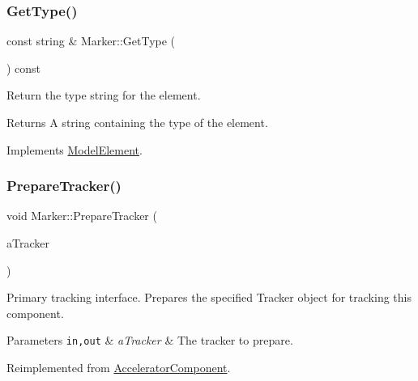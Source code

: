 \mbox{\label{classMarker_a3fc5e5a8665da63bc18a28c604c71036}} 
\subsubsection{\texorpdfstring{Get\+Type()}{GetType()}}
{\footnotesize\ttfamily const string \& Marker\+::\+Get\+Type (\begin{DoxyParamCaption}{ }\end{DoxyParamCaption}) const\hspace{0.3cm}{\ttfamily [virtual]}}

Return the type string for the element. \begin{DoxyReturn}{Returns}
A string containing the type of the element. 
\end{DoxyReturn}


Implements \hyperlink{classModelElement_a04dc2e51e1999fca612eb1838ec6b271}{Model\+Element}.

\mbox{\label{classMarker_a3910ebbb39ce13360e4dd53897c490ce}} 
\subsubsection{\texorpdfstring{Prepare\+Tracker()}{PrepareTracker()}}
{\footnotesize\ttfamily void Marker\+::\+Prepare\+Tracker (\begin{DoxyParamCaption}\item[{\hyperlink{classComponentTracker}{Component\+Tracker} \&}]{a\+Tracker }\end{DoxyParamCaption})\hspace{0.3cm}{\ttfamily [virtual]}}

Primary tracking interface. Prepares the specified Tracker object for tracking this component. 
\begin{DoxyParams}[1]{Parameters}
\mbox{\tt in,out}  & {\em a\+Tracker} & The tracker to prepare. \\
\hline
\end{DoxyParams}


Reimplemented from \hyperlink{classAcceleratorComponent_ab897c54689ac946f40c3ad0716ddd4bb}{Accelerator\+Component}.

\mbox{\label{classMarker_aa1e927fe0a2eea626759daec624c97f3}} 
